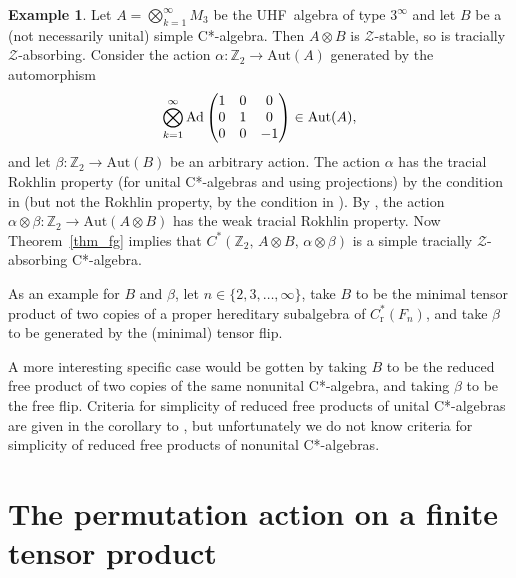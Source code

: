\documentclass[11pt]{amsart}
\theoremstyle{plain}
\theoremstyle{definition}
\newtheorem{example}[theorem]{Example}
\theoremstyle{remark}
\numberwithin{equation}{section}
\newcommand{\bt}{\beta}
\begin{document}
\begin{example}\label{exa_fg}
Let $A = \bigotimes_{k = 1} ^{\infty} M_{3}$
be the UHF~algebra of type $3^{\infty}$ and
let $B$ be a (not necessarily unital) simple C*-algebra.
Then $A \otimes B$ is $\mathcal{Z}$-stable,
so is tracially $\mathcal{Z}$-absorbing.
Consider the action
$\alpha \colon \mathbb{Z}_{2} \to \mathrm{Aut} (A)$ generated by
the automorphism
\[
\bigotimes_{k = 1}^{\infty}
  \mathrm{Ad}
   \begin{pmatrix}1&0&0 \cr 0&1&0 \cr 0&0& - 1 \end{pmatrix}
 \in \mathrm{Aut} (A),
\]
and let $\beta \colon \mathbb{Z}_{2} \to \mathrm{Aut} (B)$
be an arbitrary action.
The action $\alpha$ has the tracial Rokhlin property
(for unital C*-algebras and using projections)
by the condition in \cite[Proposition 2.5(3)]{PhT4}
(but not the Rokhlin property,
by the condition in \cite[Proposition 2.4(3)]{PhT4}).
By \cite[Proposition~4.5]{FG17}, the action
$\alpha \otimes \beta
 \colon \mathbb{Z}_{2} \to \mathrm{Aut} (A \otimes B)$
has the weak tracial Rokhlin property.
Now Theorem~\ref{thm_fg} implies that
$C^*(\mathbb{Z}_{2}, \, A \otimes B, \, \alpha \otimes \beta)$
is a simple tracially $\mathcal{Z}$-absorbing
C*-algebra.

As an example for $B$ and $\bt$,
let $n \in \{ 2, 3, \ldots, \infty \}$,
take $B$ to be the minimal tensor product of two copies
of a proper hereditary subalgebra of $C^*_{\mathrm{r}} (F_n)$,
and take $\bt$ to be generated by the (minimal) tensor flip.
\end{example}

A more interesting specific case
would be gotten by taking $B$ to be
the reduced free product of two copies of
the same nonunital C*-algebra,
and taking $\bt$ to be the free flip.
Criteria for simplicity of reduced free products
of unital C*-algebras are given in
the corollary to \cite[Proposition 3.1]{Avtz},
but unfortunately we do not know criteria
for simplicity of reduced free products
of nonunital C*-algebras.





\section{The permutation action on a finite tensor product}\label{Sec_Perm}
\end{document}
